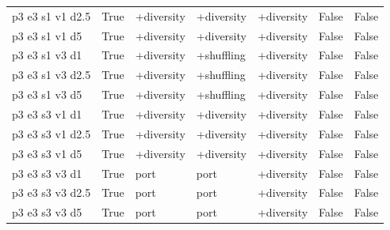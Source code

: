\begin{table}[t]
\begin{tabular}{lllllll}
p3 e3 s1 v1 d2.5 & True & +diversity & +diversity & +diversity & False & False \\
p3 e3 s1 v1 d5 & True & +diversity & +diversity & +diversity & False & False \\
p3 e3 s1 v3 d1 & True & +diversity & +shuffling & +diversity & False & False \\
p3 e3 s1 v3 d2.5 & True & +diversity & +shuffling & +diversity & False & False \\
p3 e3 s1 v3 d5 & True & +diversity & +shuffling & +diversity & False & False \\
p3 e3 s3 v1 d1 & True & +diversity & +diversity & +diversity & False & False \\
p3 e3 s3 v1 d2.5 & True & +diversity & +diversity & +diversity & False & False \\
p3 e3 s3 v1 d5 & True & +diversity & +diversity & +diversity & False & False \\
p3 e3 s3 v3 d1 & True & port & port & +diversity & False & False \\
p3 e3 s3 v3 d2.5 & True & port & port & +diversity & False & False \\
p3 e3 s3 v3 d5 & True & port & port & +diversity & False & False \\
\bottomrule
\end{tabular}
\end{table}
